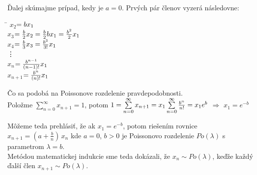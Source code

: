 \documentclass[a4paper,10pt]{article}
\theoremstyle{plain}
\theoremstyle{definition}
\begin{document}
Ďalej skúmajme prípad, kedy je $ a=0 $. Prvých pár členov vyzerá následovne: 
\begin{spacing}{1.6}
\begin{tabbing}
\hspace{1cm}\=\kill
$ x_{2}$\>$=b\*x_{1}    $\\
$ x_{3}$\>$=\frac{b}{2}\*x_{2} = \frac{b}{2}\*b\*x_{1}=\frac{b^{2}}{2}\*x_{1}   $\\
$ x_{4}$\>$=\frac{b}{3}\*x_{3} = \frac{b^{3}}{3!}\*x_{1}  $\\
\vdots \\
$ x_{n}$\>$=\frac{b^{n-1}}{(n-1)!}\*x_{1}    $\\
$ x_{n+1}$\>$=\frac{b^{n}}{(n)!}\*x_{1}    $\\
\end{tabbing} 
\end{spacing}
Čo sa podobá na Poissonove rozdelenie pravdepodobnosti. \\
Položme $ \sum\limits_{n=0}^\infty x_{n+1} = 1 $, potom $ 1=\sum\limits_{n=0}^\infty x_{n+1} = x_{1}\*\sum\limits_{n=0}^\infty \frac{b^{n}}{n!} = x_{1}\*e^{b}$ $ \Rightarrow $ $ x_{1} = e^{-b} $

Môžeme teda prehlásiť, že ak $x_{1}=e^{-b} $, potom riešením rovnice
$x_{n+1}=\left(a+{\frac{b}{n}}\right)\,x_{n}$ kde $a=0$, $b>0$
je Poissonovo rozdelenie $Po(\lambda)$ s parametrom $\lambda=b$.\\
Metódou matematickej indukcie sme teda dokázali, že $x_{n}\sim Po(\lambda)$, keďže každý ďalší člen $x_{n+1}\sim Po(\lambda)$.\\

\end{document}
